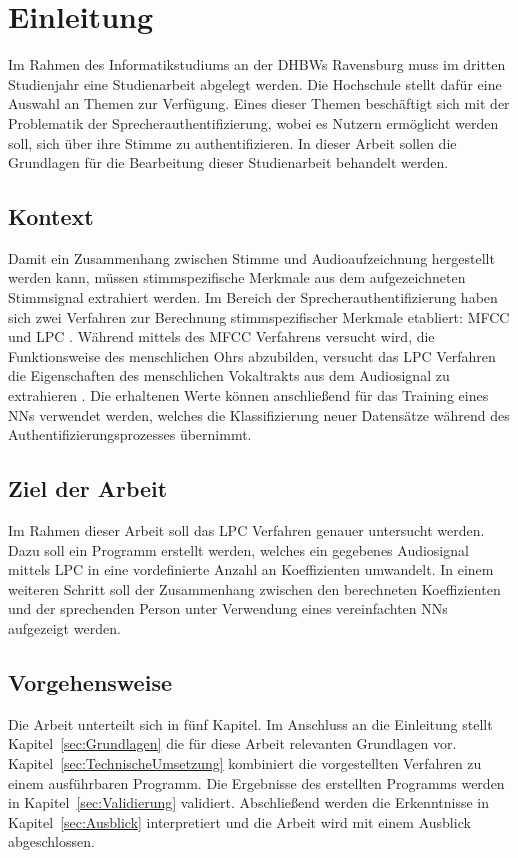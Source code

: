\section{Einleitung}\label{sec:Einleitung}
Im Rahmen des Informatikstudiums an der \acp{DHBW} Ravensburg muss im dritten Studienjahr eine Studienarbeit abgelegt werden.
Die Hochschule stellt dafür eine Auswahl an Themen zur Verfügung.
Eines dieser Themen beschäftigt sich mit der Problematik der Sprecherauthentifizierung, wobei es Nutzern ermöglicht werden soll, sich über ihre Stimme zu authentifizieren.
In dieser Arbeit sollen die Grundlagen für die Bearbeitung dieser Studienarbeit behandelt werden.

\subsection{Kontext}
Damit ein Zusammenhang zwischen Stimme und Audioaufzeichnung hergestellt werden kann, müssen stimm\-spezifische Merkmale aus dem aufgezeichneten Stimmsignal extrahiert werden.
Im Bereich der Sprecherauthentifizierung haben sich zwei Verfahren zur Berechnung stimm\-spezifischer Merkmale etabliert: \ac{MFCC} und \ac{LPC} \autocite[vgl.][S. 116]{sidorov_text-independent_2010}\autocite[vgl.][S. 726]{chelali_text_2017}.
Während mittels des \ac{MFCC} Verfahrens versucht wird, die Funktionsweise des menschlichen Ohrs abzubilden, versucht das \ac{LPC} Verfahren die Eigenschaften des menschlichen Vokaltrakts aus dem Audiosignal zu extrahieren \autocite[vgl.][S. 117]{sidorov_text-independent_2010}.
Die erhaltenen Werte können anschließend für das Training eines \acp{NN} verwendet werden, welches die Klassifizierung neuer Datensätze während des Authentifizierungsprozesses übernimmt.

\subsection{Ziel der Arbeit}
Im Rahmen dieser Arbeit soll das \ac{LPC} Verfahren genauer untersucht werden.
Dazu soll ein Programm erstellt werden, welches ein gegebenes Audiosignal mittels \ac{LPC} in eine vordefinierte Anzahl an Koeffizienten umwandelt.
In einem weiteren Schritt soll der Zusammenhang zwischen den berechneten Koeffizienten und der sprechenden Person unter Verwendung eines vereinfachten \acp{NN} aufgezeigt werden.

\subsection{Vorgehensweise}
Die Arbeit unterteilt sich in fünf Kapitel.
Im Anschluss an die Einleitung stellt Kapitel~\ref{sec:Grundlagen} die für diese Arbeit relevanten Grundlagen vor.
Kapitel~\ref{sec:TechnischeUmsetzung} kombiniert die vorgestellten Verfahren zu einem ausführbaren Programm.
Die Ergebnisse des erstellten Programms werden in Kapitel~\ref{sec:Validierung} validiert.
Abschließend werden die Erkenntnisse in Kapitel~\ref{sec:Ausblick} interpretiert und die Arbeit wird mit einem Ausblick abgeschlossen.
